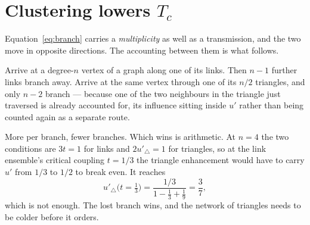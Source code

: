\section{Clustering lowers \texorpdfstring{$T_{c}$}{Tc}}
\label{sec:clustering}

Equation~\eqref{eq:branch} carries a \emph{multiplicity} as well as a
transmission, and the two move in opposite directions. The accounting between
them is what follows.

Arrive at a degree-$n$ vertex of a graph along one of its links. Then $n-1$
further links branch away. Arrive at the same vertex through one of its $n/2$
triangles, and only $n-2$ branch --- because one of the two neighbours in the
triangle just traversed is already accounted for, its influence sitting inside
$u'$ rather than being counted again as a separate route.

More per branch, fewer branches. Which wins is arithmetic. At $n=4$ the two
conditions are $3t=1$ for links and $2u'_{\triangle}=1$ for triangles, so at the
link ensemble's critical coupling $t=1/3$ the triangle enhancement would have to
carry $u'$ from $1/3$ to $1/2$ to break even. It reaches
\begin{equation}
  u'_{\triangle}\bigl(t=\tfrac13\bigr)
    =\frac{1/3}{1-\tfrac13+\tfrac19}=\frac{3}{7},
\end{equation}
which is not enough. The lost branch wins, and the network of triangles needs to
be colder before it orders.

